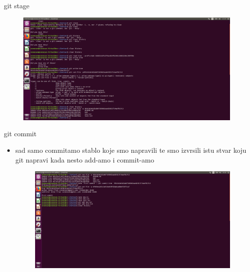 \documentclass[]{beamer}
\begin{document}
\begin{frame}{git stage}
	\begin{figure}
		\centering
	\includegraphics[scale=.01]{./slike/sesta_slika.jpg}
	\end{figure}


\end{frame}

\begin{frame}{git commit}

\begin{itemize}
	\item sad samo commitamo stablo koje smo napravili te smo izvrsili istu stvar koju git napravi kada nesto add-amo i commit-amo
	\begin{figure}
		\centering
	\includegraphics[scale=.01]{./slike/sedma_slika.jpg}
	\end{figure}
\end{itemize}
\end{frame}
\end{document}

